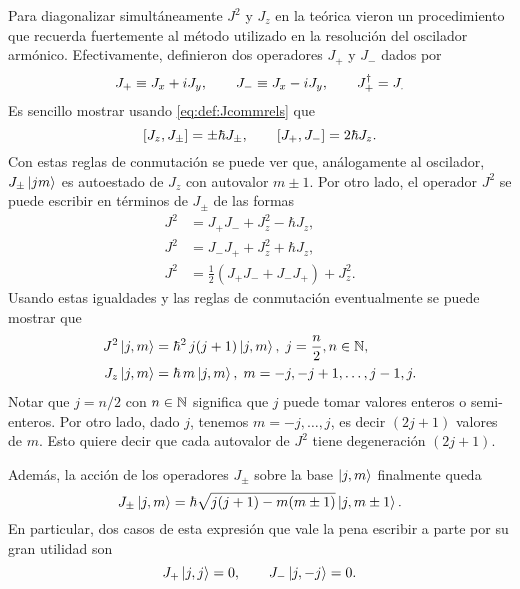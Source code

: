 \documentclass[10pt, a4paper]{article}
\newcommand{\jpmprefact}{\hbar\sqrt{j(j+1) - m(m\pm1)}}
\numberwithin{equation}{subsection}
\begin{document}
\bigbreak

Para diagonalizar simultáneamente $J^2$ y $J_z$ en la teórica vieron un
procedimiento que recuerda fuertemente al método utilizado en la resolución del
oscilador armónico. Efectivamente, definieron dos operadores $J_+$ y $J_-$
dados por
\begin{equation} \label{eq:def:Jpm}
  J_+ \equiv J_x + iJ_y, \qquad J_- \equiv J_x -iJ_y, \qquad J_+^\dagger = J_.
\end{equation}
Es sencillo mostrar usando \eqref{eq:def:Jcommrels} que
\begin{equation} \label{eq:prop:Jpmcommrels}
  \comm{J_z}{J_\pm} = \pm\hbar J_\pm, \qquad \comm{J_+}{J_-} = 2\hbar J_z.
\end{equation}
Con estas reglas de conmutación se puede ver que, análogamente al oscilador,
$J_\pm\ket{jm}$ es autoestado de $J_z$ con autovalor $m\pm1$. Por otro lado, el
operador $J^2$ se puede escribir en términos de $J_\pm$ de las formas
\begin{align}
  J^2 &= J_+J_- + J_z^2 - \hbar J_z, \label{eq:prop:J2Jpmwriting1} \\
  J^2 &= J_-J_+ + J_z^2 + \hbar J_z, \label{eq:prop:J2Jpmwriting2} \\
  J^2 &= \frac{1}{2}\left(J_+J_- + J_-J_+\right) + J_z^2.
    \label{eq:prop:J2Jpmwriting3}
\end{align}
Usando estas igualdades y las reglas de conmutación eventualmente se puede
mostrar que
\begin{align}
  J^2\ket{j,m} &= \hbar^2\,j(j+1)\ket{j,m}, \;j = \frac{n}{2}, n\in\mathbb{N},
    \label{eq:prop:J2action} \\
  J_z\ket{j,m} &= \hbar\,m\ket{j,m}, \;m = -j, -j + 1, \dots, j - 1, j.
    \label{eq:prop:Jzaction}
\end{align}
Notar que $j = n/2$ con $n \in \mathbb{N}$ significa que $j$ puede tomar valores
enteros o semi-enteros. Por otro lado, dado $j$, tenemos $m = -j, \dots, j$, es
decir $(2j + 1)$ valores de $m$. Esto quiere decir que cada autovalor de $J^2$
tiene degeneración $(2j+1)$.

Además, la acción de los operadores $J_\pm$ sobre la base $\ket{j,m}$
finalmente queda
\begin{equation} \label{eq:prop:Jpmaction}
  J_\pm\ket{j,m} = \jpmprefact\ket{j,m\pm1}.
\end{equation}
En particular, dos casos de esta expresión que vale la pena escribir a parte
por su gran utilidad son
\begin{equation} \label{eq:prop:Jpmzeroaction}
  J_+\ket{j,j} = 0, \qquad J_-\ket{j,-j} = 0.
\end{equation}
\end{document}
